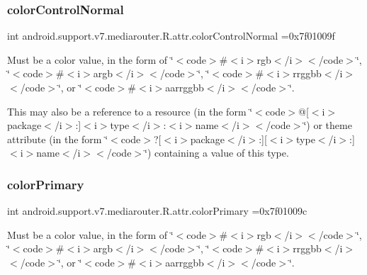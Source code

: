 \subsubsection{\texorpdfstring{color\+Control\+Normal}{colorControlNormal}}
{\footnotesize\ttfamily int android.\+support.\+v7.\+mediarouter.\+R.\+attr.\+color\+Control\+Normal =0x7f01009f\hspace{0.3cm}{\ttfamily [static]}}

Must be a color value, in the form of \char`\"{}$<$code$>$\#$<$i$>$rgb$<$/i$>$$<$/code$>$\char`\"{}, \char`\"{}$<$code$>$\#$<$i$>$argb$<$/i$>$$<$/code$>$\char`\"{}, \char`\"{}$<$code$>$\#$<$i$>$rrggbb$<$/i$>$$<$/code$>$\char`\"{}, or \char`\"{}$<$code$>$\#$<$i$>$aarrggbb$<$/i$>$$<$/code$>$\char`\"{}. 

This may also be a reference to a resource (in the form \char`\"{}$<$code$>$@\mbox{[}$<$i$>$package$<$/i$>$\+:\mbox{]}$<$i$>$type$<$/i$>$\+:$<$i$>$name$<$/i$>$$<$/code$>$\char`\"{}) or theme attribute (in the form \char`\"{}$<$code$>$?\mbox{[}$<$i$>$package$<$/i$>$\+:\mbox{]}\mbox{[}$<$i$>$type$<$/i$>$\+:\mbox{]}$<$i$>$name$<$/i$>$$<$/code$>$\char`\"{}) containing a value of this type. \mbox{\label{classandroid_1_1support_1_1v7_1_1mediarouter_1_1R_1_1attr_a145bc9b53bbf312ff2935682368395ca}} 
\subsubsection{\texorpdfstring{color\+Primary}{colorPrimary}}
{\footnotesize\ttfamily int android.\+support.\+v7.\+mediarouter.\+R.\+attr.\+color\+Primary =0x7f01009c\hspace{0.3cm}{\ttfamily [static]}}

Must be a color value, in the form of \char`\"{}$<$code$>$\#$<$i$>$rgb$<$/i$>$$<$/code$>$\char`\"{}, \char`\"{}$<$code$>$\#$<$i$>$argb$<$/i$>$$<$/code$>$\char`\"{}, \char`\"{}$<$code$>$\#$<$i$>$rrggbb$<$/i$>$$<$/code$>$\char`\"{}, or \char`\"{}$<$code$>$\#$<$i$>$aarrggbb$<$/i$>$$<$/code$>$\char`\"{}. 

